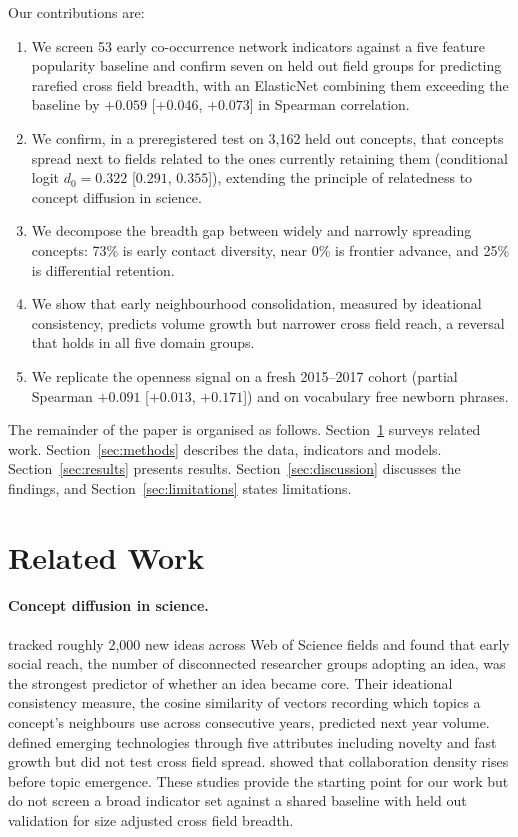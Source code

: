 \documentclass[11pt,letterpaper]{article}
\begin{document}
Our contributions are:
\begin{enumerate}
  \item We screen 53 early co-occurrence network indicators against a
    five feature popularity baseline and confirm seven on held out field groups
    for predicting rarefied cross field breadth, with an ElasticNet combining
    them exceeding the baseline by $+0.059$ [$+0.046$, $+0.073$] in Spearman
    correlation.
  \item We confirm, in a preregistered test on 3,162 held out concepts, that
    concepts spread next to fields related to the ones currently retaining them
    (conditional logit $d_0 = 0.322$ [$0.291$, $0.355$]), extending the principle
    of relatedness to concept diffusion in science.
  \item We decompose the breadth gap between widely and narrowly spreading
    concepts: 73\% is early contact diversity, near 0\% is frontier advance,
    and 25\% is differential retention.
  \item We show that early neighbourhood consolidation, measured by ideational
    consistency, predicts volume growth but narrower cross field reach, a
    reversal that holds in all five domain groups.
  \item We replicate the openness signal on a fresh 2015--2017 cohort (partial
    Spearman $+0.091$ [$+0.013$, $+0.171$]) and on vocabulary free newborn
    phrases.
\end{enumerate}

The remainder of the paper is organised as follows. Section~\ref{sec:related}
surveys related work. Section~\ref{sec:methods} describes the data,
indicators and models. Section~\ref{sec:results} presents results.
Section~\ref{sec:discussion} discusses the findings, and
Section~\ref{sec:limitations} states limitations.

\section{Related Work}
\label{sec:related}

\paragraph{Concept diffusion in science.}
\citet{Cheng2023} tracked roughly 2,000 new ideas across Web of Science fields
and found that early social reach, the number of disconnected researcher groups
adopting an idea, was the strongest predictor of whether an idea became core.
Their ideational consistency measure, the cosine similarity of vectors recording which topics a concept's neighbours
use across consecutive years, predicted next year volume.
\citet{Rotolo2015} defined emerging technologies through five attributes
including novelty and fast growth but did not test cross field spread.
\citet{Salatino2017} showed that collaboration density rises before topic
emergence. These studies provide the starting point for our work but do not
screen a broad indicator set against a shared baseline with held out validation
for size adjusted cross field breadth.
\end{document}
